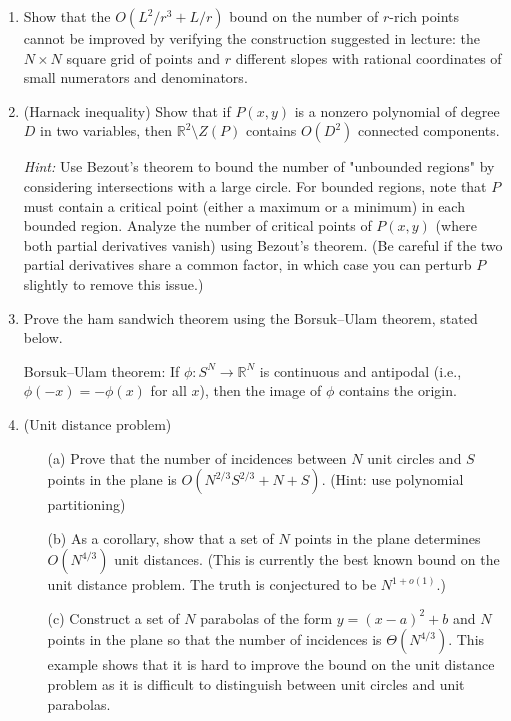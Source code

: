 \documentclass{article}
\newcommand{\RR}{\mathbb{R}}
\begin{document}
\begin{enumerate}
\item
Show that the $O(L^2/r^3 + L/r)$ bound on the number of $r$-rich points cannot be improved by verifying the construction suggested in lecture: the $N \times N$ square grid of points and $r$ different slopes with rational coordinates of small numerators and denominators.

\item

(Harnack inequality) Show that if $P(x,y)$ is a nonzero polynomial of degree $D$ in two variables, then $\RR^2 \setminus Z(P)$ contains $O(D^2)$ connected components.

\emph{Hint:} Use Bezout's theorem to bound the number of "unbounded regions" by considering intersections with a large circle. For bounded regions, note that $P$ must contain a critical point (either a maximum or a minimum) in each bounded region. Analyze the number of critical points of $P(x,y)$ (where both partial derivatives vanish) using Bezout's theorem. (Be careful if the two partial derivatives share a common factor, in which case you can perturb $P$ slightly to remove this issue.)

\item

Prove the ham sandwich theorem using the Borsuk--Ulam theorem, stated below.

Borsuk--Ulam theorem: If $\phi \colon S^N \to \RR^N$ is continuous and antipodal (i.e., $\phi(-x) = -\phi(x)$ for all $x$), then the image of $\phi$ contains the origin.

\item

(Unit distance problem)

\begin{enumerate}
	\item[(a)] Prove that the number of incidences between $N$ unit circles and $S$ points in the plane is $O(N^{2/3} S^{2/3} + N + S)$. (Hint: use polynomial partitioning)
	\item[(b)] As a corollary, show that a set of $N$ points in the plane determines $O(N^{4/3})$ unit distances.  
(This is currently the best known bound on the unit distance problem. The truth is conjectured to be $N^{1+o(1)}$.)
	\item[(c)] Construct a set of $N$ parabolas of the form $y = (x-a)^2 + b$ and $N$ points in the plane so that the number of incidences is $\Theta(N^{4/3})$.  
This example shows that it is hard to improve the bound on the unit distance problem as it is difficult to distinguish between unit circles and unit parabolas.
\end{enumerate}


\end{enumerate}
\end{document}
